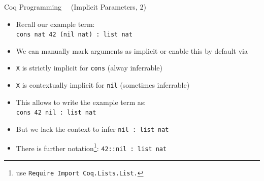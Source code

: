 \begin{frame}[fragile]{Coq Programming\small~~ (Implicit Parameters, 2)}

\begin{itemize}
  \item Recall our example term:\\
  \lstinline|cons nat 42 (nil nat) : list nat|

  \pause

  \item We can manually mark arguments as implicit or enable this by default via
  

  \pause

  \item \lstinline|X| is strictly implicit for \lstinline|cons| (alway inferrable)

  \pause

  \item \lstinline|X| is contextually implicit for \lstinline|nil| (sometimes inferrable)

  \pause

  \item This allows to write the example term as:\\
  \lstinline|cons 42 nil : list nat|

  \pause

  \item But we lack the context to infer
  \lstinline|nil : list nat|

  \pause

  \item There is further notation\footnote{use \lstinline|Require Import Coq.Lists.List.|}: \lstinline|42::nil : list nat|
\end{itemize}
\end{frame}

